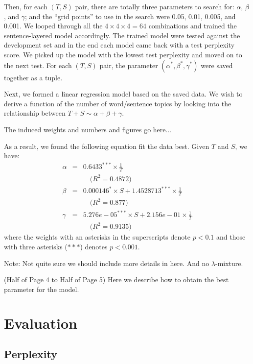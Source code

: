 Then, for each $(T, S)$ pair, there are totally three parameters to search for:
$\alpha$, $\beta$, and $\gamma$; and the ``grid points'' to use in the search
were 0.05, 0.01, 0.005, and 0.001.  We looped through all the $4 \times 4
\times 4 = 64$ combinations and trained the sentence-layered model accordingly.
The trained model were tested against the development set and in the end each
model came back with a test perplexity score.  We picked up the model with the
lowest test perplexity and moved on to the next test.  For each $(T, S)$ pair,
the parameter $(\alpha^*, \beta^*, \gamma^*)$ were saved together as a tuple.

Next, we formed a linear regression model based on the saved data.  We wish to
derive a function of the number of word/sentence topics by looking into the
relationship between $T + S \sim \alpha + \beta + \gamma$.  

{ \color{red} The induced weights and numbers and figures go here... }

As a result, we found the following equation fit the data best.  Given $T$ and
$S$, we have:
\begin{eqnarray*}
  \alpha &=& 0.6433^{***} \times \frac{1}{T} \\
  && \quad \textrm{($R^2 = 0.4872$)} \nonumber\\
  \beta &=& 0.000146^{*} \times S + 1.4528713^{***} \times \frac{1}{T} \\
  && \quad \textrm{($R^2 = 0.877$)} \nonumber\\
  \gamma &=& 5.276e-05^{***} \times S + 2.156e-01 \times \frac{1}{T} \\
  && \quad \textrm{($R^2 = 0.9135$)} \nonumber
\end{eqnarray*}
where the weights with an asterisks in the superscripts denote $p < 0.1$ and
those with three asterisks ($***$) denotes $p < 0.001$.

{ \color{red} Note: Not quite sure we should include more details in here.  And no $\lambda$-mixture. }

{ \color{red} (Half of Page 4 to Half of Page 5) Here we
describe how to obtain the best parameter for the model. }

\section{Evaluation}
\subsection{Perplexity}

